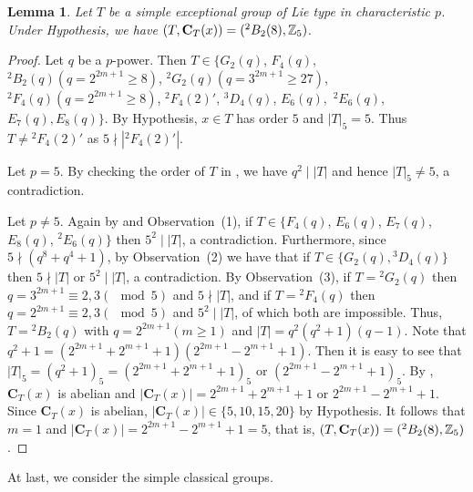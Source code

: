 \documentclass[12pt,reqno]{amsart}
\def\C{\mathbf{C}}   \newcommand\Cay{\mathrm{Cay}}   \newcommand\Cos{\mathrm{Cos}} \newcommand{\CGammaSp}{\mathrm{C\Gamma Sp}}
\numberwithin {equation} {section}
\newtheorem{lemma}[theorem]{Lemma}
\begin{document}
 \begin{lemma}\label{lm:excptional}
Let $T$ be a simple exceptional group of Lie type in characteristic $p$. Under Hypothesis, we have $(T,\C_T(x))=(^2B_2(8),\ZZ_5)$.
 \end{lemma}
 \begin{proof} Let $q$ be a $p$-power. Then $T \in\{ G_2(q)$, $F_4(q)$,  ${}^2B_2(q) (q=2^{2m+1}\geq 8)$, ${}^2G_2(q)(q=3^{2m+1}\geq 27)$, ${}^2F_4(q)(q=2^{2m+1}\geq 8)$, ${}^2F_4(2)'$, ${}^3D_4(q )$, $E_6(q),$ ${}^2E_6(q)$, $E_7(q), E_8(q)\}$. By Hypothesis, $x\in T$ has order $5$ and $|T|_5=5$. Thus $T \neq {}^2F_4(2)'$ as $5 \nmid |{}^2F_4(2)'|$.

Let $p=5$. By checking the order of $T$ in \cite[Table 5.1.B]{K-Lie}, we have $q^2\mid |T|$ and hence $|T|_5\neq 5$, a contradiction.

Let $p\neq 5$. Again by \cite[Table 5.1.B]{K-Lie} and Observation~(1), if $T \in \{ F_4(q)$, $E_6(q)$, $E_7(q)$, $E_8(q)$, ${}^2E_6(q)\}$ then $5^2\mid |T|$, a contradiction. Furthermore, since $5\nmid (q^8+q^4+1)$, by Observation~(2) we have that if $T\in \{G_2(q),{}^3D_4(q )\}$ then $5\nmid |T|$ or $5^2\mid |T|$, a contradiction. By Observation~(3), if $T={}^2G_2(q)$ then $q=3^{2m+1} \equiv 2,3 (\mod 5)$ and  $5\nmid |T|$, and if $T={}^2F_4(q)$ then $q=2^{2m+1}  \equiv 2,3 (\mod 5)$ and $5^2\mid |T|$, of which both are impossible.
Thus, $T={}^2B_2(q)$ with $q=2^{2m+1}(m\geq 1) $ and $|T|=q^2(q^2+1)(q-1)$. Note that $q^2+1=(2^{2m+1}+2^{m+1}+1)(2^{2m+1}-2^{m+1}+1)$. Then it is easy to see that $|T|_5=(q^2+1)_5=(2^{2m+1}+2^{m+1}+1)_5$ or $(2^{2m+1}-2^{m+1}+1)_5$.
By \cite[Proposition 16 and Theorem 15]{S1964}, $\C_T(x)$ is abelian and $|\C_T(x)|=2^{2m+1}+2^{m+1}+1 $ or $2^{2m+1}-2^{m+1}+1 $. Since $\C_T(x)$ is abelian, $|\C_T(x)| \in \{5,10,15,20\} $ by Hypothesis. It follows that $m=1$  and $|\C_T(x)|= 2^{2m+1}-2^{m+1}+1 =5$, that is, $(T,\C_T(x))=({}^2B_2(8),\ZZ_5)$.
\end{proof}

At last, we consider the  simple classical groups.
\end{document}
